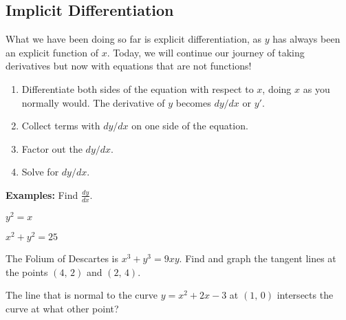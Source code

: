 \documentclass[addpoints, 12pt]{exam}
\begin{document}
\subsection*{Implicit Differentiation}
What we have been doing so far is explicit differentiation, as $y$ has always been an explicit function of $x$. Today, we will continue our journey of taking derivatives but now with equations that are not functions!\\
\begin{tcolorbox}[title= STEPS FOR IMPLICIT DIFFERENTIATION,black,sharp corners,colback=white,colbacktitle=white,coltitle=black,boxrule=1pt]
    \begin{enumerate}
        \item Differentiate both sides of the equation with respect to $x$, doing $x$ as you normally would. The derivative of $y$ becomes $dy/dx$ or $y'$.
        \item Collect terms with $dy/dx$ on one side of the equation.
        \item Factor out the $dy/dx$.
        \item Solve for $dy/dx$.
    \end{enumerate}
\end{tcolorbox}
\vspace{.15cm}
\nodindent\textbf{Examples:} Find $\displaystyle\frac{dy}{dx}$.
\begin{questions}
    \begin{minipage}{.45\linewidth}
    \question $\displaystyle y^2=x$
    \end{minipage}
    \hfill
    \begin{minipage}{.45\linewidth}
    \question $\displaystyle x^2+y^2=25$
    \end{minipage}
    
    
    \question The Folium of Descartes is $x^3+y^3=9xy$. Find and graph the tangent lines at the points $(4,\,2)$ and $(2,\,4)$.
    
    
    
    \newpage
    
    \question The line that is normal to the curve $y=x^2+2x-3$ at $(1,\,0)$ intersects the curve at what other point?
    
\end{questions}
\end{document}
